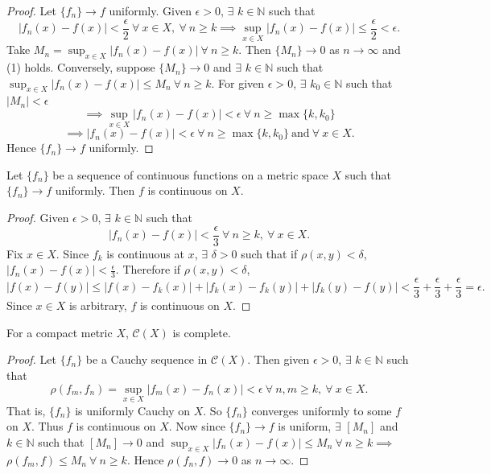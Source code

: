 \documentclass{functionspaces}
\begin{document}
\begin{proof}
Let $\{f_{n}\}\to f$ uniformly. Given $\epsilon>0$, $\exists$ $k\in\mathbb{N}$ such that
\[
|f_{n}(x)-f(x)|<\frac{\epsilon}{2}\ \forall\ x\in X,\ \forall\ n\geq k\implies\sup_{x\in X}|f_{n}(x)-f(x)|\leq\frac{\epsilon}{2}<\epsilon.
\]
Take $M_{n}=\sup_{x\in X}|f_{n}(x)-f(x)|\ \forall\ n\geq k$. Then $\{M_{n}\}\to 0$ as $n\to\infty$ and (1) holds. Conversely, suppose $\{M_{n}\}\to 0$ and $\exists$ $k\in\mathbb{N}$ such that $\sup_{x\in X}|f_{n}(x)-f(x)|\leq M_{n}\ \forall\ n\geq k$. For given $\epsilon>0$, $\exists$ $k_{0}\in\mathbb{N}$ such that $|M_{n}|<\epsilon$
\[
\implies\sup_{x\in X}|f_{n}(x)-f(x)|<\epsilon\ \forall\ n\geq\max\{k,k_{0}\}
\]
\[
\implies|f_{n}(x)-f(x)|<\epsilon\ \forall\ n\geq\max\{k,k_{0}\}\ \text{and}\ \forall\ x\in X.
\]
Hence $\{f_{n}\}\to f$ uniformly.
\end{proof}

\begin{proposition}
Let $\{f_{n}\}$ be a sequence of continuous functions on a metric space $X$ such that $\{f_{n}\}\to f$ uniformly. Then $f$ is continuous on $X$.
\end{proposition}

\begin{proof}
Given $\epsilon>0$, $\exists$ $k\in\mathbb{N}$ such that
\[
|f_{n}(x)-f(x)|<\frac{\epsilon}{3}\ \forall\ n\geq k,\ \forall\ x\in X.
\]
Fix $x\in X$. Since $f_{k}$ is continuous at $x$, $\exists$ $\delta>0$ such that if $\rho(x,y)<\delta$, $|f_{n}(x)-f(x)|<\frac{\epsilon}{3}$. Therefore if $\rho(x,y)<\delta$,
\[
|f(x)-f(y)|\leq|f(x)-f_{k}(x)|+|f_{k}(x)-f_{k}(y)|+|f_{k}(y)-f(y)|<\frac{\epsilon}{3}+\frac{\epsilon}{3}+\frac{\epsilon}{3}=\epsilon.
\]
Since $x\in X$ is arbitrary, $f$ is continuous on $X$.
\end{proof}

\begin{theorem}
For a compact metric $X$, $\mathcal{C}(X)$ is complete.
\end{theorem}

\begin{proof}
Let $\{f_{n}\}$ be a Cauchy sequence in $\mathcal{C}(X)$. Then given $\epsilon>0$, $\exists$ $k\in\mathbb{N}$ such that
\[
\rho(f_{m},f_{n})=\sup_{x\in X}|f_{m}(x)-f_{n}(x)|<\epsilon\ \forall\ n,m\geq k,\ \forall\ x\in X.
\]
That is, $\{f_{n}\}$ is uniformly Cauchy on $X$. So $\{f_{n}\}$ converges uniformly to some $f$ on $X$. Thus $f$ is continuous on $X$. Now since $\{f_{n}\}\to f$ is uniform, $\exists$ $[M_{n}]$ and $k\in\mathbb{N}$ such that $[M_{n}]\to 0$ and $\sup_{x\in X}|f_{n}(x)-f(x)|\leq M_{n}\ \forall\ n\geq k\implies$ $\rho(f_{m},f)\leq M_{n}\ \forall\ n\geq k$. Hence $\rho(f_{n},f)\to 0$ as $n\to\infty$.
\end{proof}
\end{document}
